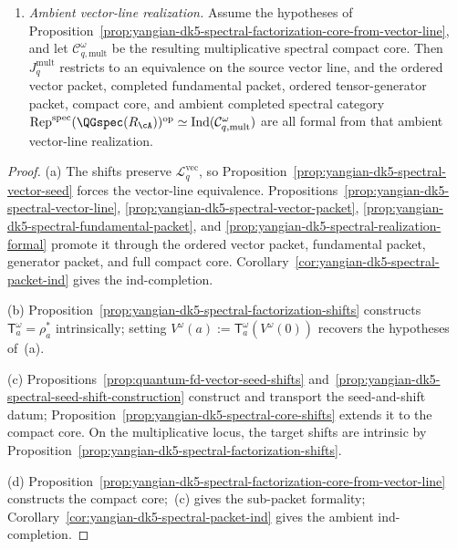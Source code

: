\begin{corollary}
\begin{enumerate}[label=\textup{(\alph*)}]
\item\emph{Ambient vector-line realization.}
 Assume the hypotheses of
 Proposition~\ref{prop:yangian-dk5-spectral-factorization-core-from-vector-line},
 and let \(\mathcal C_{q,\mathrm{mult}}^\omega\) be the resulting
 multiplicative spectral compact core. Then \(J_q^{\mathrm{mult}}\)
 restricts to an equivalence on the source vector line, and the
 ordered vector packet, completed fundamental packet, ordered
 tensor-generator packet, compact core, and ambient completed spectral
 category
 \(\operatorname{Rep}^{\mathrm{spec}}(\QGspec(R_{\cA}))^{\mathrm{op}}
 \simeq
 \operatorname{Ind}(\mathcal C_{q,\mathrm{mult}}^\omega)\)
 are all formal from that ambient vector-line realization.
\end{enumerate}
\end{corollary}

\begin{proof}
\textup{(a)}
The shifts preserve \(\mathcal{L}^{\mathrm{vec}}_{q}\), so
Proposition~\ref{prop:yangian-dk5-spectral-vector-seed} forces the
vector-line equivalence.
Propositions~\ref{prop:yangian-dk5-spectral-vector-line},
\ref{prop:yangian-dk5-spectral-vector-packet},
\ref{prop:yangian-dk5-spectral-fundamental-packet}, and
\ref{prop:yangian-dk5-spectral-realization-formal}
promote it through the ordered vector packet,
fundamental packet, generator packet, and full compact core.
Corollary~\ref{cor:yangian-dk5-spectral-packet-ind} gives the
ind-completion.

\textup{(b)}
Proposition~\ref{prop:yangian-dk5-spectral-factorization-shifts}
constructs \(\mathsf T_a^\omega=\rho_a^*\) intrinsically; setting
\(V^\omega(a):=\mathsf T_a^\omega(V^\omega(0))\) recovers the
hypotheses of~\textup{(a)}.

\textup{(c)}
Propositions~\ref{prop:quantum-fd-vector-seed-shifts}
and~\ref{prop:yangian-dk5-spectral-seed-shift-construction} construct
and transport the seed-and-shift datum;
Proposition~\ref{prop:yangian-dk5-spectral-core-shifts} extends it to
the compact core. On the multiplicative locus, the target shifts are
intrinsic by
Proposition~\ref{prop:yangian-dk5-spectral-factorization-shifts}.

\textup{(d)}
Proposition~\ref{prop:yangian-dk5-spectral-factorization-core-from-vector-line}
constructs the compact core;~\textup{(c)} gives the sub-packet
formality; Corollary~\ref{cor:yangian-dk5-spectral-packet-ind} gives
the ambient ind-completion.
\end{proof}

